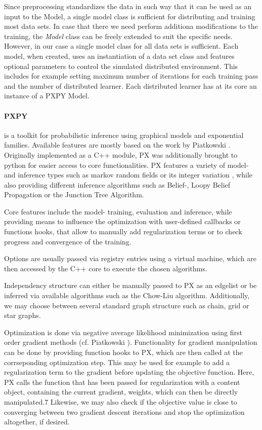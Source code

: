 

Since preprocessing standardizes the data in such way that it can be used as an input to the Model, a single model class is sufficient for distributing and training most data sets.
In case that there we need perform additiona modifications to the training, the \textit{Model} class can be freely extended to suit the specific needs.
However, in our case a single model class for all data sets is sufficient.
Each model, when created, uses an instantiation of a data set class and features optional parameters to control the simulated distributed environment. 
This includes for example setting maximum number of iterations for each training pass and the number of distributed learner.
Each distributed learner has at its core an instance of a PXPY Model.

\paragraph*{PXPY}
is a toolkit for probabilistic inference using graphical models and exponential families.
Available features are mostly based on the work by Piatkowski \cite{piatkowski2018exponential}.
Originally implemented as a C++ module, PX was additionally brought to python for easier access to core functionalities.
PX features a variety of model- and inference types such as markov random fields or its integer variation , while also providing different inference algorithms such as Belief-, Loopy Belief Propagation or the Junction Tree Algorithm.

Core features include the model- training, evaluation and inference, while providing means to influence the optimization with user-defined callbacks or functions hooks, that allow to manually add regularization terms or to check progress and convergence of the training.

Options are usually passed via registry entries using a virtual machine, which are then accessed by the C++ core to execute the chosen algorithms.

Independency structure can either be manually passed to PX as an edgelist or be inferred via available algorithms such as the Chow-Liu algorithm. 
Additionally, we may choose between several standard graph structure such as chain, grid or star graphs.

Optimization is done via negative average likelihood minimization using first order gradient methods (cf. Piatkowski \cite{piatkowski2018exponential}).
Functionality for gradient manipulation can be done by providing function hooks to PX, which are then called at the corrseponding optimization step.
This may be used for example to add a regularization term to the gradient before updating the objective function. 
Here, PX calls the function that has been passed for regularization with a content object, containing the current gradient, weights, which can then be directly manipulated.7
Likewise, we may also check if the objective value is close to converging between two gradient descent iterations and stop the optimization altogether, if desired.


